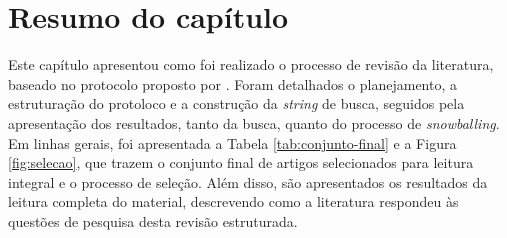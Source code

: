\section{Resumo do capítulo}

Este capítulo apresentou como foi realizado o processo de revisão da literatura, baseado no protocolo proposto por . Foram detalhados o planejamento, a estruturação do protoloco e a construção da \textit{string} de busca, seguidos pela apresentação dos resultados, tanto da busca, quanto do processo de \textit{snowballing}. Em linhas gerais, foi apresentada a Tabela \ref{tab:conjunto-final} e a Figura \ref{fig:selecao}, que trazem o conjunto final de artigos selecionados para leitura integral e o processo de seleção. Além disso, são apresentados os resultados da leitura completa do material, descrevendo como a literatura respondeu às questões de pesquisa desta revisão estruturada.